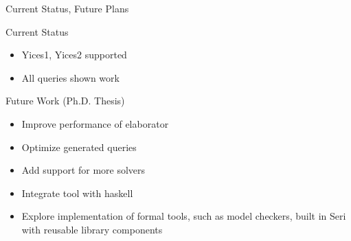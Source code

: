 \documentclass{beamer}
\begin{document}
\begin{frame}{Current Status, Future Plans}
\begin{block}{Current Status}
    \begin{itemize}
        \item Yices1, Yices2 supported
        \item All queries shown work
    \end{itemize}
\end{block}
\pause
\begin{block}{Future Work (Ph.D. Thesis)}
    \begin{itemize}
        \item Improve performance of elaborator
        \item Optimize generated queries
        \item Add support for more solvers
        \item Integrate tool with haskell
        \item Explore implementation of formal tools, such as model checkers,
              built in Seri with reusable library components
    \end{itemize}
\end{block}
\end{frame}
\end{document}
